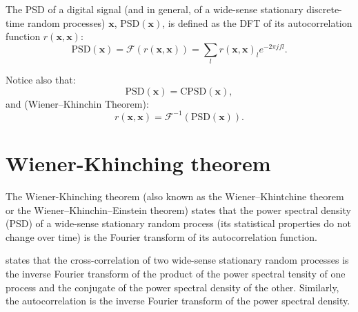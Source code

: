 \documentclass{article}
\begin{document}
The PSD of a digital signal (and in general, of a wide-sense
stationary discrete-time random processes) $\mathbf{x}$,
$\text{PSD}(\mathbf{x})$, is defined as the DFT of its
autocorrelation function $r(\mathbf{x},\mathbf{x})$:
\begin{equation}
  \text{PSD}(\mathbf{x}) = \mathcal{F}(r(\mathbf{x},\mathbf{x})) = \sum_l r(\mathbf{x},\mathbf{x})_le^{-2\pi jfl}.
\end{equation}

Notice also that:
\begin{equation}
  \text{PSD}(\mathbf{x}) = \text{CPSD}(\mathbf{x}),
\end{equation}
and (Wiener–Khinchin Theorem):
\begin{equation}
  r(\mathbf{x},\mathbf{x}) = \mathcal{F}^{-1}(\text{PSD}(\mathbf{x})).
\end{equation}

\section{Wiener-Khinching theorem}
\label{sec:WKT}

The Wiener-Khinching theorem (also known as the Wiener–Khintchine
theorem or the Wiener–Khinchin–Einstein theorem) states that the power
spectral density (PSD) of a wide-sense stationary random process (its
statistical properties do not change over time) is the Fourier
transform of its autocorrelation function.


states that the
cross-correlation of two wide-sense stationary random processes is the
inverse Fourier transform of the product of the power spectral tensity
of one process and the conjugate of the power spectral density of the
other. Similarly, the autocorrelation is the inverse Fourier
transform of the power spectral density.
\end{document}
